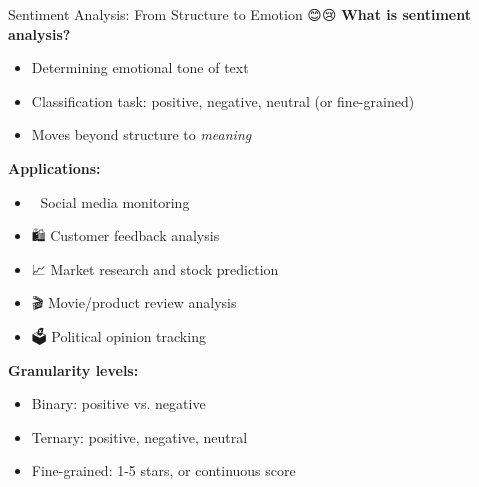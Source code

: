 \documentclass[aspectratio=169]{beamer}
\begin{document}
\begin{frame}[shrink=10]{Sentiment Analysis: From Structure to Emotion 😊😢}
    \textbf{What is sentiment analysis?}
    \begin{itemize}\setlength{\itemsep}{0pt}
        \item Determining emotional tone of text
        \item Classification task: positive, negative, neutral (or fine-grained)
        \item Moves beyond structure to \textit{meaning}
    \end{itemize}

    \vspace{0.5em}
    \textbf{Applications:}
    \begin{itemize}\setlength{\itemsep}{0pt}
        \item 📱 Social media monitoring
        \item 🛍️ Customer feedback analysis
        \item 📈 Market research and stock prediction
        \item 🎬 Movie/product review analysis
        \item 🗳️ Political opinion tracking
    \end{itemize}

    \vspace{0.5em}
    \textbf{Granularity levels:}
    \begin{itemize}\setlength{\itemsep}{0pt}
        \item Binary: positive vs. negative
        \item Ternary: positive, negative, neutral
        \item Fine-grained: 1-5 stars, or continuous score
    \end{itemize}
\end{frame}
\end{document}
